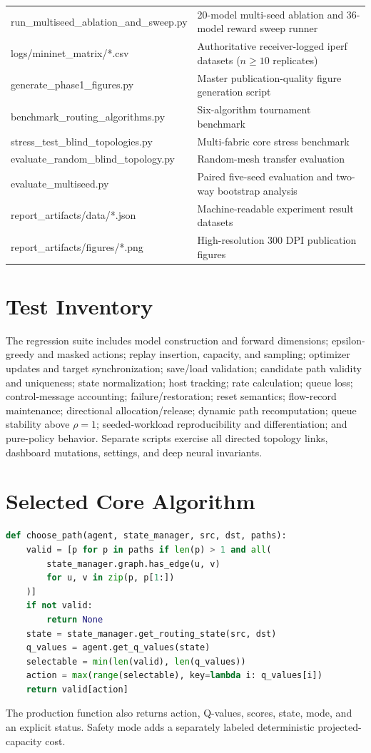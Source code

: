 \documentclass[12pt,a4paper,oneside]{report}
\begin{document}
\begin{longtable}{>{\raggedright\arraybackslash\ttfamily\footnotesize}p{76mm}>{\raggedright\arraybackslash\small}p{68mm}}
run\_multiseed\_ablation\_and\_sweep.py & 20-model multi-seed ablation and 36-model reward sweep runner\\
logs/mininet\_matrix/*.csv & Authoritative receiver-logged iperf datasets ($n \ge 10$ replicates)\\
generate\_phase1\_figures.py & Master publication-quality figure generation script\\
benchmark\_routing\_algorithms.py & Six-algorithm tournament benchmark\\
stress\_test\_blind\_topologies.py & Multi-fabric core stress benchmark\\
evaluate\_random\_blind\_topology.py & Random-mesh transfer evaluation\\
evaluate\_multiseed.py & Paired five-seed evaluation and two-way bootstrap analysis\\
report\_artifacts/data/*.json & Machine-readable experiment result datasets\\
report\_artifacts/figures/*.png & High-resolution 300 DPI publication figures\\
\bottomrule
\end{longtable}

\chapter{Test Inventory}
\label{app:tests}
The regression suite includes model construction and forward dimensions; epsilon-greedy and masked actions; replay insertion, capacity, and sampling; optimizer updates and target synchronization; save/load validation; candidate path validity and uniqueness; state normalization; host tracking; rate calculation; queue loss; control-message accounting; failure/restoration; reset semantics; flow-record maintenance; directional allocation/release; dynamic path recomputation; queue stability above $\rho=1$; seeded-workload reproducibility and differentiation; and pure-policy behavior. Separate scripts exercise all directed topology links, dashboard mutations, settings, and deep neural invariants.

\chapter{Selected Core Algorithm}
\label{app:algorithm}
\begin{lstlisting}[language=Python,caption={Canonical pure-policy decision, simplified}]
def choose_path(agent, state_manager, src, dst, paths):
    valid = [p for p in paths if len(p) > 1 and all(
        state_manager.graph.has_edge(u, v)
        for u, v in zip(p, p[1:])
    )]
    if not valid:
        return None
    state = state_manager.get_routing_state(src, dst)
    q_values = agent.get_q_values(state)
    selectable = min(len(valid), len(q_values))
    action = max(range(selectable), key=lambda i: q_values[i])
    return valid[action]
\end{lstlisting}
The production function also returns action, Q-values, scores, state, mode, and an explicit status. Safety mode adds a separately labeled deterministic projected-capacity cost.
\end{document}
